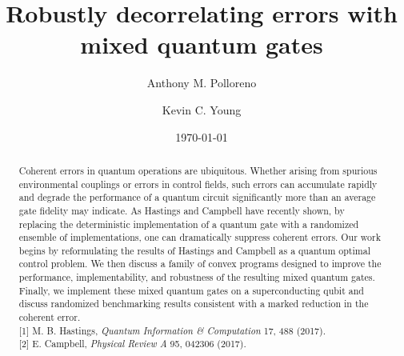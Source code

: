 \documentclass[aps,nofootinbib,pra,notitlepage,twocolumn]{revtex4-1}
\newcommand{\0}{\ensuremath{\mathbf{0}}}
\begin{document}
\title{Robustly decorrelating errors with mixed quantum gates}

\author{Anthony M. Polloreno}
\author{Kevin C. Young}

\date{\today}

\begin{abstract}
\noindent Coherent errors in quantum operations are ubiquitous. Whether arising from spurious environmental couplings or errors in control fields, such errors can accumulate rapidly and degrade the performance of a quantum circuit significantly more than an average gate fidelity may indicate. As Hastings \cite{Hastings2017} and Campbell \cite{Campbell2017} have recently shown, by replacing the deterministic implementation of a quantum gate with a randomized ensemble of implementations, one can dramatically suppress coherent errors. Our work begins by reformulating the results of Hastings and Campbell as a quantum optimal control problem. We then discuss a family of convex programs designed to improve the performance, implementability, and robustness of the resulting mixed quantum gates. Finally, we implement these mixed quantum gates on a superconducting qubit and discuss randomized benchmarking results consistent with a marked reduction in the coherent error.\\
{[1]} M. B. Hastings, \emph{Quantum Information \& Computation} 17, 488 (2017). \\
{[2]} E. Campbell, \emph{Physical Review A} 95, 042306 (2017).
\end{abstract}

\pacs{}

\maketitle


\end{document}
